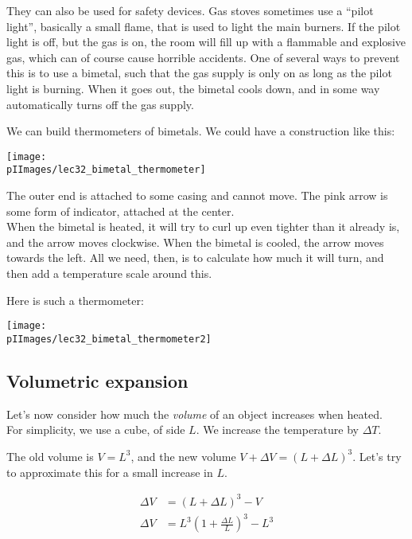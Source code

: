They can also be used for safety devices. Gas stoves sometimes use a ``pilot light'', basically a small flame, that is used to light the main burners. If the pilot light is off, but the gas is on, the room will fill up with a flammable and explosive gas, which can of course cause horrible accidents. One of several ways to prevent this is to use a bimetal, such that the gas supply is only on as long as the pilot light is burning. When it goes out, the bimetal cools down, and in some way automatically turns off the gas supply.

We can build thermometers of bimetals. We could have a construction like this:

\begin{center}
\texttt{[image: \\pIImages/lec32\_bimetal\_thermometer]}
\end{center}

The outer end is attached to some casing and cannot move. The pink arrow is some form of indicator, attached at the center.\\
When the bimetal is heated, it will try to curl up even tighter than it already is, and the arrow moves clockwise. When the bimetal is cooled, the arrow moves towards the left. All we need, then, is to calculate how much it will turn, and then add a temperature scale around this.

Here is such a thermometer:

\begin{center}
\texttt{[image: \\pIImages/lec32\_bimetal\_thermometer2]}
\end{center}

\subsection{Volumetric expansion}

Let's now consider how much the \emph{volume} of an object increases when heated.\\
For simplicity, we use a cube, of side $L$. We increase the temperature by $\Delta T$.

The old volume is $V = L^3$, and the new volume $V + \Delta V = \left(L + \Delta L\right)^3$. Let's try to approximate this for a small increase in $L$.

\begin{align}
\Delta V &= \left(L + \Delta L\right)^3 - V\\
\Delta V &= L^3 \left(1 +  \frac{\Delta L}{L}\right)^3 - L^3
\end{align}


